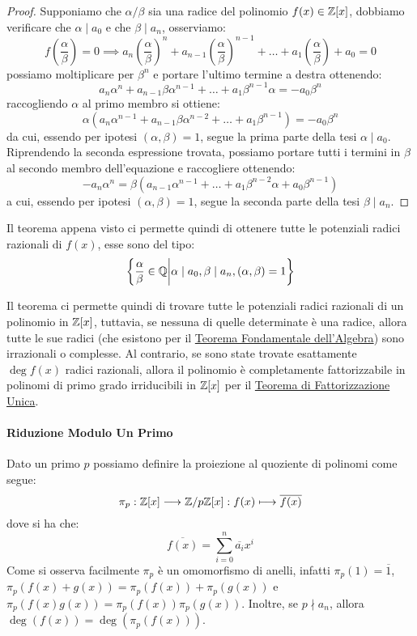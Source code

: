 \documentclass[11pt]{scrartcl}
\begin{document}
\begin{proof}
Supponiamo che $\alpha/\beta$ sia una radice del polinomio $f(x) \in \mathbb Z[x]$, dobbiamo verificare che $\alpha \mid a_0$ e che $\beta \mid a_n$, osserviamo:
	\[ f\left(\frac{\alpha}{\beta}\right) = 0 \implies a_n\left(\frac{\alpha}{\beta}\right)^n + a_{n-1}\left(\frac{\alpha}{\beta}\right)^{n-1} + \ldots + a_1\left(\frac{\alpha}{\beta}\right) + a_0 = 0
	\]
possiamo moltiplicare per $\beta^n$ e portare l'ultimo termine a destra ottenendo:
	\[ a_n\alpha^n + a_{n-1}\beta\alpha^{n-1} + \ldots + a_1\beta^{n-1}\alpha = -a_0\beta^n
	\]
raccogliendo $\alpha$ al primo membro si ottiene:
	\[ \alpha(a_n\alpha^{n-1} + a_{n-1}\beta\alpha^{n-2} + \ldots + a_1\beta^{n-1}) = -a_0\beta^n
	\]
da cui, essendo per ipotesi $(\alpha,\beta) = 1$, segue la prima parte della tesi $ \alpha \mid a_0$. Riprendendo la seconda espressione trovata, possiamo portare tutti i termini in $\beta$ al secondo membro dell'equazione e raccogliere ottenendo:
	\[ -a_n\alpha^n = \beta(a_{n-1}\alpha^{n-1} + \ldots + a_1\beta^{n-2}\alpha + a_0\beta^{n-1})
	\]
a cui, essendo per ipotesi $(\alpha,\beta) = 1$, segue la seconda parte della tesi $ \beta \mid a_n$.
\end{proof}

Il teorema appena visto ci permette quindi di ottenere tutte le potenziali radici razionali di $f(x)$, esse sono del tipo:
	\[ \left\{\frac{\alpha}{\beta} \in \mathbb Q \middle| \alpha \mid a_0, \beta \mid a_n, (\alpha,\beta) = 1 \right\}
	\]

\begin{remark}
Il teorema ci permette quindi di trovare tutte le potenziali radici razionali di un polinomio in $\mathbb Z[x]$, tuttavia, se nessuna di quelle determinate è una radice, allora tutte le sue radici (che esistono per il \hyperref[p:tf]{Teorema Fondamentale dell'Algebra}) sono irrazionali o complesse. Al contrario, se sono state trovate esattamente $\deg f(x)$ radici razionali, allora il polinomio è completamente fattorizzabile in polinomi di primo grado irriducibili in $\mathbb Z[x]$ per il \hyperref[p:fac]{Teorema di Fattorizzazione Unica}.
\end{remark}


\paragraph{Riduzione Modulo Un Primo}  \hfill\break
 Dato un primo $p$ possiamo definire la proiezione al quoziente di polinomi come segue:
	\[ \pi_p : \mathbb Z[x] \longrightarrow {\mathbb Z}/p{\mathbb Z}[x] : f(x) \longmapsto \overline{f(x)}
	\]
dove si ha che:
	\[ \overline{f(x)} = \sum_{i=0}^{n} \overline{a_i} x^i
	\]
Come si osserva facilmente $\pi_p$ è un omomorfismo di anelli, infatti $\pi_p(1) = \overline 1$, $\pi_p(f(x)+g(x)) = \pi_p(f(x)) + \pi_p(g(x))$ e $\pi_p(f(x)g(x)) = \pi_p(f(x))\pi_p(g(x))$. Inoltre, se $p \nmid a_n$, allora $\deg(f(x)) = \deg(\pi_p(f(x)))$.
\end{document}
